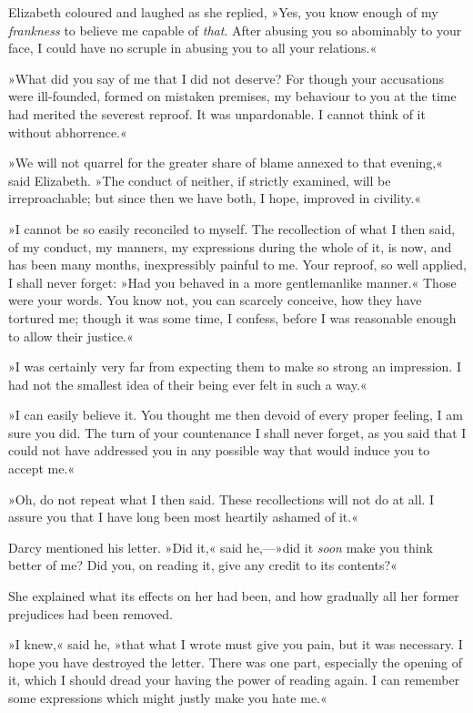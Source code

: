 Elizabeth coloured and laughed as she replied, »Yes, you know enough of my \textit{frankness} to believe me capable of \textit{that}. After abusing you so abominably to your face, I could have no scruple in abusing you to all your relations.«

»What did you say of me that I did not deserve? For though your accusations were ill-founded, formed on mistaken premises, my behaviour to you at the time had merited the severest reproof. It was unpardonable. I cannot think of it without abhorrence.«

»We will not quarrel for the greater share of blame annexed to that evening,« said Elizabeth. »The conduct of neither, if strictly examined, will be irreproachable; but since then we have both, I hope, improved in civility.«

»I cannot be so easily reconciled to myself. The recollection of what I then said, of my conduct, my manners, my expressions during the whole of it, is now, and has been many months, inexpressibly painful to me. Your reproof, so well applied, I shall never forget: »Had you behaved in a more gentlemanlike manner.« Those were your words. You know not, you can scarcely conceive, how they have tortured me; though it was some time, I confess, before I was reasonable enough to allow their justice.«

»I was certainly very far from expecting them to make so strong an impression. I had not the smallest idea of their being ever felt in such a way.«

»I can easily believe it. You thought me then devoid of every proper feeling, I am sure you did. The turn of your countenance I shall never forget, as you said that I could not have addressed you in any possible way that would induce you to accept me.«

»Oh, do not repeat what I then said. These recollections will not do at all. I assure you that I have long been most heartily ashamed of it.«

Darcy mentioned his letter. »Did it,« said he,—»did it \textit{soon} make you think better of me? Did you, on reading it, give any credit to its contents?«

She explained what its effects on her had been, and how gradually all her former prejudices had been removed.

»I knew,« said he, »that what I wrote must give you pain, but it was necessary. I hope you have destroyed the letter. There was one part, especially the opening of it, which I should dread your having the power of reading again. I can remember some expressions which might justly make you hate me.«

